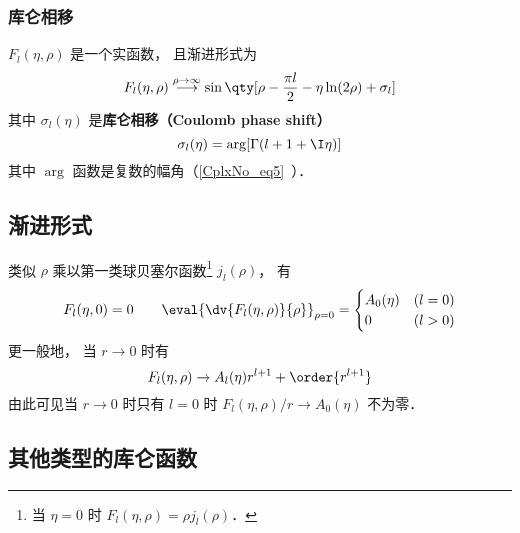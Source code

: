 \subsubsection{库仑相移}
$F_l(\eta, \rho)$ 是一个实函数， 且渐进形式为
\begin{equation}\label{CulmF_eq7}
F_l(\eta, \rho) \overset{\rho\to \infty}{\longrightarrow} \sin\qty[\rho - \frac{\pi l}{2} - \eta\ln(2\rho) + \sigma_l]
\end{equation}
其中 $\sigma_l(\eta)$ 是\textbf{库仑相移（Coulomb phase shift）}
\begin{equation}\label{CulmF_eq8}
\sigma_l(\eta) = \arg[\Gamma(l+1+\I\eta)]
\end{equation}
其中 $\arg$ 函数是复数的幅角（\autoref{CplxNo_eq5}~）．

\subsection{渐进形式}
类似 $\rho$ 乘以第一类球贝塞尔函数\footnote{当 $\eta = 0$ 时 $F_l(\eta, \rho)=\rho j_l(\rho)$．} $j_l(\rho)$， 有
\begin{equation}
F_l(\eta, 0) = 0 \qquad \eval{\dv{F_l(\eta, \rho)}{\rho}}_{\rho=0} = 
\begin{cases}
A_0(\eta) &(l = 0)\\
0     &(l > 0)
\end{cases}
\end{equation}
更一般地， 当 $r\to 0$ 时有
\begin{equation} %
F_l(\eta, \rho) \rightarrow A_l(\eta) r^{l+1} + \order{r^{l+1}}
\end{equation}
由此可见当 $r\to 0$ 时只有 $l = 0$ 时 $F_l(\eta, \rho)/r \to A_0(\eta)$ 不为零．

\subsection{其他类型的库仑函数}

